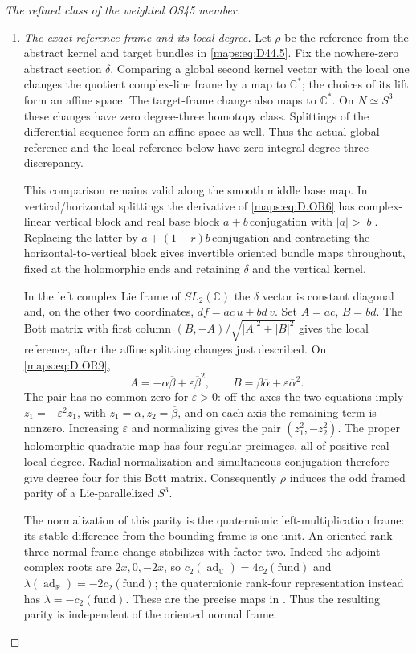 \begin{proof}[The refined class of the weighted OS45 member]
\begin{enumerate}
\item \emph{The exact reference frame and its local degree.}
Let $\rho$ be the reference from the abstract kernel and target bundles
in \eqref{maps:eq:D44.5}.  Fix the nowhere-zero abstract section
$\delta$.  Comparing a global second kernel vector with the local one
changes the quotient complex-line frame by a map to $\mathbb C^*$;
the choices of its lift form an affine space.  The target-frame change
also maps to $\mathbb C^*$.  On $N\simeq S^3$ these changes have zero
degree-three homotopy class.  Splittings of the differential sequence
form an affine space as well.  Thus the actual global reference and the
local reference below have zero integral degree-three discrepancy.

This comparison remains valid along the smooth middle base map.
In vertical/horizontal splittings the derivative of \eqref{maps:eq:D.OR6}
has complex-linear vertical block and real base block
$a+b\,\text{conjugation}$ with $|a|>|b|$.  Replacing the latter by
$a+(1-r)b\,\text{conjugation}$ and contracting the horizontal-to-vertical
block gives invertible oriented bundle maps throughout, fixed at the
holomorphic ends and retaining $\delta$ and the vertical kernel.

In the left complex Lie frame of $SL_2(\mathbb C)$ the $\delta$ vector is
constant diagonal and, on the other two coordinates, $df=ac\,u+bd\,v$.
Set $A=ac$, $B=bd$.  The Bott matrix with first column
$(B,-A)/\sqrt{|A|^2+|B|^2}$ gives the local reference, after the affine
splitting changes just described.  On \eqref{maps:eq:D.OR9},
\[
 A=-\alpha\overline\beta+\varepsilon\overline\beta^2,
 \qquad B=\beta\overline\alpha+\varepsilon\overline\alpha^2.
 \tag{D.OR10}\label{maps:eq:D.OR10}
\]
The pair has no common zero for $\varepsilon>0$: off the axes the two
equations imply $z_1=-\varepsilon^2z_1$, with
$z_1=\overline\alpha,z_2=\overline\beta$, and on each axis the remaining
term is nonzero.  Increasing $\varepsilon$ and normalizing gives the
pair $(z_1^2,-z_2^2)$.  The proper holomorphic quadratic map has four
regular preimages, all of positive real local degree.  Radial
normalization and simultaneous conjugation therefore give degree four
for this Bott matrix.  Consequently $\rho$ induces the odd framed
parity of a Lie-parallelized $S^3$.

The normalization of this parity is the quaternionic left-multiplication
frame: its stable difference from the bounding frame is one unit.
An oriented rank-three normal-frame change stabilizes with factor two.
Indeed the adjoint complex roots are $2x,0,-2x$, so
$c_2(\operatorname{ad}_{\mathbb C})=4c_2(\mathrm{fund})$ and
$\lambda(\operatorname{ad}_{\mathbb R})=-2c_2(\mathrm{fund})$;
the quaternionic rank-four representation instead has
$\lambda=-c_2(\mathrm{fund})$.
These are the precise maps in
\cite[Remark~2.17, p.~12; \S6.1, pp.~24--25]{Redden2011StringStructures}.
Thus the resulting parity is independent of the oriented normal frame.


\end{enumerate}
\end{proof}
